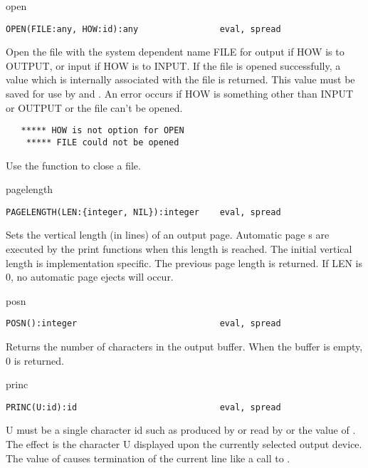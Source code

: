 \begin{Function}{open}
\begin{verbatim}
OPEN(FILE:any, HOW:id):any                eval, spread
\end{verbatim}
   Open  the file with the system  dependent name FILE for output
   if  HOW is   to OUTPUT, or input  if HOW is   to INPUT. If
   the  file is opened successfully,  a value which is internally
   associated  with the  file is  returned.   This value  must be
   saved  for  use by   and . An  error  occurs if  HOW is
   something  other than  INPUT or  OUTPUT or  the file  can't be
   opened.
\begin{verbatim}
   ***** HOW is not option for OPEN
    ***** FILE could not be opened
\end{verbatim}
Use the  function to close a file.

\end{Function}
\begin{Function}{pagelength}
\begin{verbatim}
PAGELENGTH(LEN:{integer, NIL}):integer    eval, spread
\end{verbatim}
   Sets  the  vertical  length  (in  lines)  of  an  output page.
   Automatic  page  s are  executed  by the  print functions
   when  this length  is reached.    The initial  vertical length
   is  implementation  specific.    The previous  page  length is
   returned.     If  LEN is  0,  no  automatic  page  ejects will
   occur.

\end{Function}
\begin{Function}{posn}
\begin{verbatim}
POSN():integer                            eval, spread
\end{verbatim}
   Returns  the number of characters in  the output buffer.  When
   the buffer is empty, 0 is returned.

\end{Function}
\begin{Function}{princ}
\begin{verbatim}
PRINC(U:id):id                            eval, spread
\end{verbatim}
   U  must be a  single character id such  as produced by 
   or  read by   or the  value of .    The effect is
   the  character U displayed upon  the currently selected output
   device.     The value  of   causes  termination  of the
   current line like a call to .

\end{Function}
